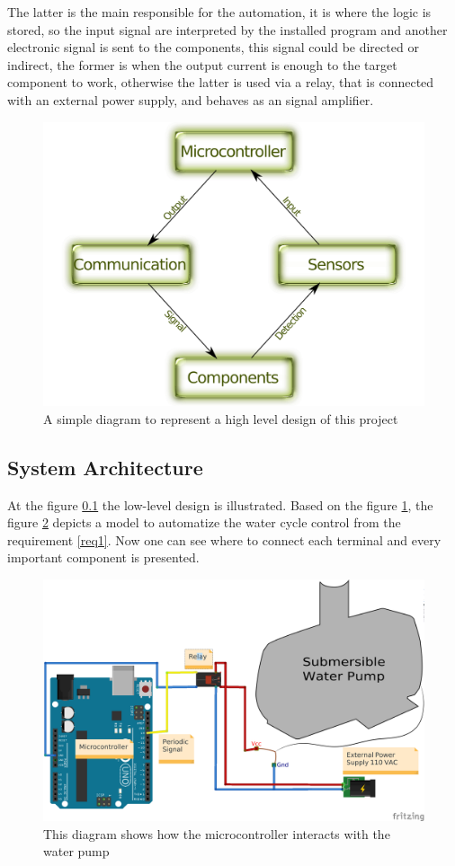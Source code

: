 The latter is the main responsible for the automation,
it is where the logic is stored,
so the input signal are interpreted by the installed program and another electronic signal is sent to the components,
this signal could be directed or indirect,
the former is when the output current is enough to the target component to work,
otherwise the latter is used via a relay,
that is connected with an external power supply,
and behaves as an signal amplifier.

\begin{figure}[h]
    \centering
    \includegraphics[width=.7\linewidth]{diagrams/systemDesign}
    \caption{A simple diagram to represent a high level design of this project}
    \label{fig:highLevelSystemDesign}
\end{figure}

\subsection{System Architecture}
\label{sec:architecture}

At the figure \ref{sec:architecture} the low-level design is illustrated.
Based on the figure \ref{fig:highLevelSystemDesign},
the figure \ref{fig:waterCycleDiagram} depicts a model to automatize the water cycle control from the requirement \ref{req1}.
Now one can see where to connect each terminal and every important component is presented.

\begin{figure}[h]
    \centering
    \includegraphics[width=.6\linewidth]{diagrams/architecture_bb}
    \caption{This diagram shows how the microcontroller interacts with the water pump}
    \label{fig:waterCycleDiagram}
\end{figure}

